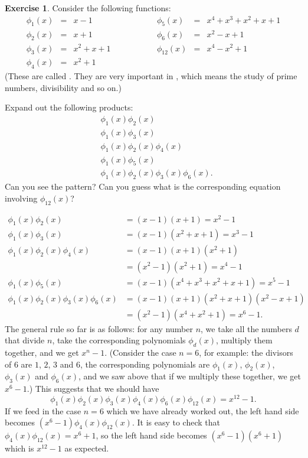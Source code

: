 \documentclass[a4paper]{book}
\theoremstyle{definition}
\newtheorem{exercise}[theorem]{Exercise}
\renewenvironment{solution}{\SolutionInline}{\endSolutionInline}
\begin{document}
\begin{exercise}
 Consider the following functions:
 \[ \begin{array}{rclcrcl}
  \phi_1(x) &=& x - 1 & \hspace{4em} &
   \phi_5(x) &=& x^4 + x^3 + x^2 + x + 1\\
  \phi_2(x) &=& x + 1 &&
   \phi_6(x) &=& x^2 - x + 1\\
  \phi_3(x) &=& x^2 + x + 1 &&
   \phi_{12}(x) &=& x^4 - x^2 + 1 \\
  \phi_4(x) &=& x^2 + 1
 \end{array} \]
 (These are called 
 .  They are very important in
 , which means the study of prime numbers,
 divisibility and so on.)

 Expand out the following products:
 \begin{align*}
  & \phi_1(x)\phi_2(x) \\
  & \phi_1(x)\phi_3(x) \\
  & \phi_1(x)\phi_2(x)\phi_4(x) \\
  & \phi_1(x)\phi_5(x) \\
  & \phi_1(x)\phi_2(x)\phi_3(x)\phi_6(x).
 \end{align*}
 Can you see the pattern?  Can you guess what is the corresponding
 equation involving $\phi_{12}(x)$?
\end{exercise}
\begin{solution}
 \begin{align*}
  \phi_1(x)\phi_2(x) &= (x-1)(x+1) = x^2 - 1 \\
  \phi_1(x)\phi_3(x) &= (x-1)(x^2+x+1) = x^3 - 1 \\
  \phi_1(x)\phi_2(x)\phi_4(x) &= (x-1)(x+1)(x^2+1) \\
                              &= (x^2-1)(x^2+1) = x^4 - 1 \\
  \phi_1(x)\phi_5(x) &= (x-1)(x^4+x^3+x^2+x+1) = x^5 - 1 \\
  \phi_1(x)\phi_2(x)\phi_3(x)\phi_6(x)
   &= (x-1)(x+1)(x^2+x+1)(x^2-x+1) \\
   &= (x^2-1)(x^4+x^2+1) = x^6 - 1.
 \end{align*}
 The general rule so far is as follows: for any number $n$, we take
 all the numbers $d$ that divide $n$, take the corresponding
 polynomials $\phi_d(x)$, multiply them together, and we get $x^n-1$.
 (Consider the case $n=6$, for example: the divisors of $6$ are $1$,
 $2$, $3$ and $6$, the corresponding polynomials are $\phi_1(x)$,
 $\phi_2(x)$, $\phi_3(x)$ and $\phi_6(x)$, and we saw above that if we
 multiply these together, we get $x^6-1$.)  This suggests that we
 should have
 \[ \phi_1(x)\phi_2(x)\phi_3(x)\phi_4(x)\phi_6(x)\phi_{12}(x) =
     x^{12} - 1.
 \]
 If we feed in the case $n=6$ which we have already worked out, the
 left hand side becomes $(x^6-1)\phi_4(x)\phi_{12}(x)$.  It is easy to
 check that $\phi_4(x)\phi_{12}(x)=x^6+1$, so the left hand side
 becomes $(x^6-1)(x^6+1)$ which is $x^{12}-1$ as expected.
\end{solution}
\end{document}
